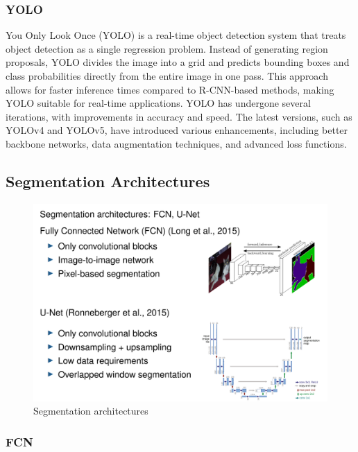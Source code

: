 \subsubsection{YOLO}

You Only Look Once (YOLO) is a real-time object detection system that treats object detection as a single regression problem. Instead of generating region proposals, YOLO divides the image into a grid and predicts bounding boxes and class probabilities directly from the entire image in one pass. This approach allows for faster inference times compared to R-CNN-based methods, making YOLO suitable for real-time applications.
YOLO has undergone several iterations, with improvements in accuracy and speed. The latest versions, such as YOLOv4 and YOLOv5, have introduced various enhancements, including better backbone networks, data augmentation techniques, and advanced loss functions.

\subsection{Segmentation Architectures}

\begin{figure}[htbp]
   \centering
   \includegraphics{images/10/segmentationArch.png}
   \caption{Segmentation architectures}
   \label{fig:10/segmentationArch}
\end{figure}
\subsubsection{FCN}

